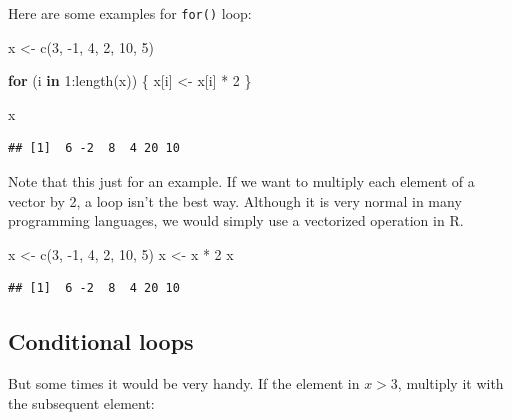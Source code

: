 \documentclass[
]{book}
\newenvironment{Shaded}{\begin{snugshade}}{\end{snugshade}}
\newcommand{\ControlFlowTok}[1]{\textcolor[rgb]{0.13,0.29,0.53}{\textbf{#1}}}
\newcommand{\DecValTok}[1]{\textcolor[rgb]{0.00,0.00,0.81}{#1}}
\newcommand{\FunctionTok}[1]{\textcolor[rgb]{0.00,0.00,0.00}{#1}}
\newcommand{\NormalTok}[1]{#1}
\newcommand{\OtherTok}[1]{\textcolor[rgb]{0.56,0.35,0.01}{#1}}
\newcommand{\SpecialCharTok}[1]{\textcolor[rgb]{0.00,0.00,0.00}{#1}}
\begin{document}
Here are some examples for \texttt{for()} loop:

\begin{Shaded}
\begin{Highlighting}[]
\NormalTok{x }\OtherTok{\textless{}{-}} \FunctionTok{c}\NormalTok{(}\DecValTok{3}\NormalTok{, }\SpecialCharTok{{-}}\DecValTok{1}\NormalTok{, }\DecValTok{4}\NormalTok{, }\DecValTok{2}\NormalTok{, }\DecValTok{10}\NormalTok{, }\DecValTok{5}\NormalTok{)}

\ControlFlowTok{for}\NormalTok{ (i }\ControlFlowTok{in} \DecValTok{1}\SpecialCharTok{:}\FunctionTok{length}\NormalTok{(x)) \{}
\NormalTok{  x[i] }\OtherTok{\textless{}{-}}\NormalTok{ x[i] }\SpecialCharTok{*} \DecValTok{2}
\NormalTok{\}}

\NormalTok{x}
\end{Highlighting}
\end{Shaded}

\begin{verbatim}
## [1]  6 -2  8  4 20 10
\end{verbatim}

Note that this just for an example. If we want to multiply each element of a vector by 2, a loop isn't the best way. Although it is very normal in many programming languages, we would simply use a vectorized operation in R.

\begin{Shaded}
\begin{Highlighting}[]
\NormalTok{x }\OtherTok{\textless{}{-}} \FunctionTok{c}\NormalTok{(}\DecValTok{3}\NormalTok{, }\SpecialCharTok{{-}}\DecValTok{1}\NormalTok{, }\DecValTok{4}\NormalTok{, }\DecValTok{2}\NormalTok{, }\DecValTok{10}\NormalTok{, }\DecValTok{5}\NormalTok{)}
\NormalTok{x }\OtherTok{\textless{}{-}}\NormalTok{ x }\SpecialCharTok{*} \DecValTok{2}
\NormalTok{x}
\end{Highlighting}
\end{Shaded}

\begin{verbatim}
## [1]  6 -2  8  4 20 10
\end{verbatim}

\hypertarget{conditional-loops}{%
\subsection{Conditional loops}\label{conditional-loops}}

But some times it would be very handy. If the element in \(x > 3\), multiply it with the subsequent element:
\end{document}
